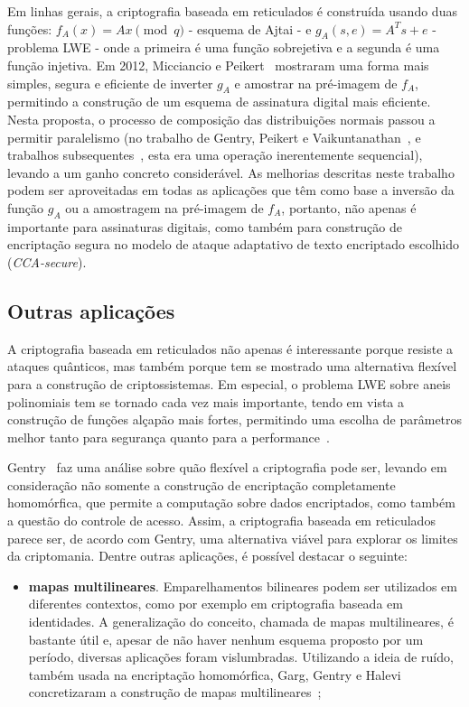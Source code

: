 \documentclass{SBCbookchapter}
\begin{document}
\begin{otherlanguage}{brazilian}
Em linhas gerais, a criptografia baseada em reticulados é construída usando duas funções: $f_A(x) = Ax \pmod q$ - esquema de Ajtai - e $g_A(s, e) = A^Ts + e$ - problema LWE - onde a primeira é uma função sobrejetiva e a segunda é uma função injetiva. Em 2012, Micciancio e Peikert~\cite{strongtrap} mostraram uma forma mais simples, segura e eficiente de inverter $g_A$ e amostrar na pré-imagem de $f_A$, permitindo a construção de um esquema de assinatura digital mais eficiente. Nesta proposta, o processo de composição das distribuições normais passou a permitir paralelismo (no trabalho de Gentry, Peikert e Vaikuntanathan~\cite{signtrap}, 
e trabalhos subsequentes~\cite{Stehle2011}, 
esta era uma operação inerentemente sequencial), levando a um ganho concreto considerável. As melhorias descritas neste trabalho podem ser aproveitadas em todas as aplicações que têm como base a inversão da função $g_A$ ou a amostragem na pré-imagem de $f_A$, portanto, não apenas é importante para assinaturas digitais, como também para construção de encriptação segura no modelo de ataque adaptativo de texto encriptado escolhido (\textit{CCA-secure}).

\subsection{Outras aplicações}

A criptografia baseada em reticulados não apenas é interessante porque resiste a ataques quânticos, mas também porque tem se mostrado uma alternativa flexível para a construção de criptossistemas. Em especial, o problema LWE sobre aneis polinomiais tem se tornado cada vez mais importante, tendo em vista a construção de funções alçapão mais fortes, permitindo uma escolha de parâmetros melhor tanto para segurança quanto para a performance~\cite{strongtrap}. 

Gentry~\cite{criptomania} faz uma análise sobre quão flexível a criptografia pode ser, levando em consideração não somente a construção de encriptação completamente homomórfica, que permite a computação sobre dados encriptados, como também a questão do controle de acesso. Assim, a criptografia baseada em reticulados parece ser, de acordo com Gentry, uma alternativa viável para explorar os limites da criptomania. Dentre outras aplicações, é possível destacar o seguinte:

\begin{itemize}
\item \textbf{mapas multilineares}. Emparelhamentos bilineares podem ser utilizados em diferentes contextos, como por exemplo em criptografia baseada em identidades. A generalização do conceito, chamada de mapas multilineares, é bastante útil e, apesar de não haver nenhum esquema proposto por um período, diversas aplicações foram vislumbradas. Utilizando a ideia de ruído, também usada na encriptação homomórfica, Garg, Gentry e Halevi concretizaram a construção de mapas multilineares~\cite{multilin};


\end{itemize}
\end{otherlanguage}
\end{document}

